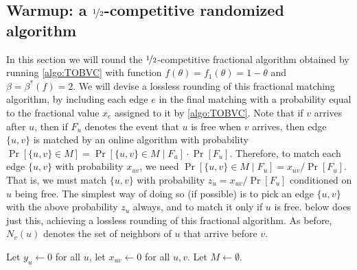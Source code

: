 \subsection{Warmup: a \texorpdfstring{$\nicefrac{1}{2}$}{(1/2)}-competitive randomized algorithm}\label{sec:warmup}

In this section we will round the $\nicefrac{1}{2}$-competitive fractional algorithm obtained by running \cref{algo:TOBVC} with function $f(\theta) = f_1 (\theta) = 1-\theta$ and $\beta = \beta^{*} (f) = 2$. We will devise a lossless rounding of this fractional matching algorithm, by including each edge $e$ in the final matching with a probability equal to the fractional value $x_e$ assigned to it by \cref{algo:TOBVC}. 
Note that if $v$ arrives after $u$, then if $F_u$ denotes the event that $u$ is free when $v$ arrives, then edge $\{u,v\}$ is matched by an online algorithm with probability $\Pr[\{u,v\}\in M] = \Pr[\{u,v\}\in M \mid F_u] \cdot \Pr[F_u]$. Therefore, to match each edge $\{u,v\}$ with probability $x_{uv}$, we need $\Pr[\{u,v\} \in M \mid F_u] = x_{uv} / \Pr[F_u]$.
That is, we must match $\{u,v\}$ with probability $z_u = x_{uv}/\Pr[F_u]$ conditioned on $u$ being free. The simplest way of doing so (if possible) is to pick an edge $\{u,v\}$ with the above probability $z_u$ always, and to match it only if $u$ is free.
 below does just this, achieving a lossless rounding of this fractional algorithm.
As before, $N_v(u)$ denotes the set of neighbors of $u$ that arrive before $v$. 

\begin{algorithm}[h]
  \DontPrintSemicolon
  Let $y_u \gets 0$ for all $u$, let $x_{uv} \gets 0$ for all $u, v$. \;
  Let $M \gets \emptyset$. \;
    \caption{Online vertex arrival warmup randomized fractional matching}
    \label{algo:warmup_algorithm}
\end{algorithm}

